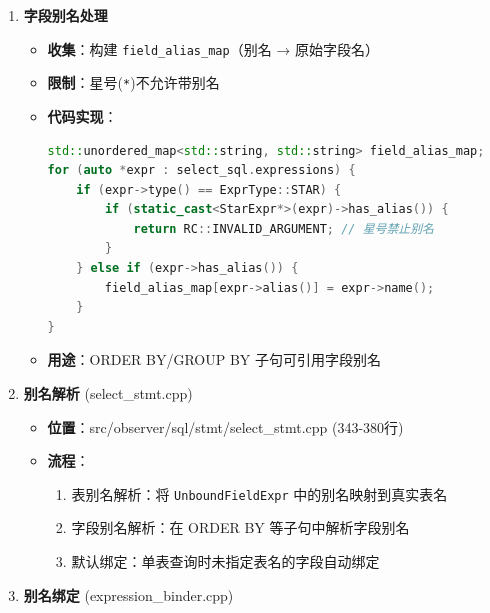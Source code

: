 \documentclass[a4paper, 12pt]{article}
\begin{document}
\begin{enumerate}
\begin{itemize}
\begin{lstlisting}[language=C++]
// 向子查询传递别名映射
if (name2alias) name2alias->insert({real_table, alias});
if (alias2name) alias2name->insert({alias, real_table});
        \end{lstlisting}
        \item \textbf{遮蔽规则}：本层别名可遮蔽外层同名别名
    \end{itemize}

    \item \textbf{字段别名处理}
    
\begin{itemize}
        \item \textbf{收集}：构建 \texttt{field\_alias\_map}（别名 → 原始字段名）
        \item \textbf{限制}：星号(\texttt{*})不允许带别名
        \item \textbf{代码实现}：
        \begin{lstlisting}[language=C++]
std::unordered_map<std::string, std::string> field_alias_map;
for (auto *expr : select_sql.expressions) {
    if (expr->type() == ExprType::STAR) {
        if (static_cast<StarExpr*>(expr)->has_alias()) {
            return RC::INVALID_ARGUMENT; // 星号禁止别名
        }
    } else if (expr->has_alias()) {
        field_alias_map[expr->alias()] = expr->name();
    }
}
        \end{lstlisting}
        \item \textbf{用途}：ORDER BY/GROUP BY 子句可引用字段别名
    \end{itemize}

    \item \textbf{别名解析} (select\_stmt.cpp)
    
\begin{itemize}
        \item \textbf{位置}：src/observer/sql/stmt/select\_stmt.cpp (343-380行)
        \item \textbf{流程}：
        \begin{enumerate}
            \item 表别名解析：将 \texttt{UnboundFieldExpr} 中的别名映射到真实表名
            \item 字段别名解析：在 ORDER BY 等子句中解析字段别名
            \item 默认绑定：单表查询时未指定表名的字段自动绑定
        \end{enumerate}
    \end{itemize}

    \item \textbf{别名绑定} (expression\_binder.cpp)
    

\end{enumerate}
\end{document}
